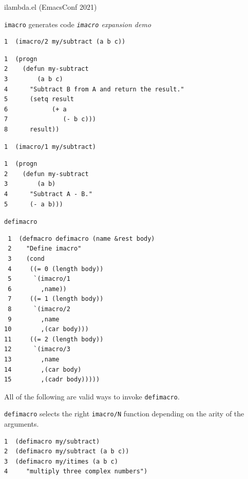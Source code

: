 \documentclass[presentation]{beamer}
\begin{document}
\begin{frame}[label={sec:org3d2ff35},fragile]{ilambda.el (EmacsConf 2021)}
\begin{block}{\texttt{imacro} generates code}
\emph{\texttt{imacro} expansion demo}

\begin{verbatim}
1  (imacro/2 my/subtract (a b c))
\end{verbatim}

\begin{verbatim}
1  (progn
2    (defun my-subtract
3        (a b c)
4      "Subtract B from A and return the result."
5      (setq result
6            (+ a
7               (- b c)))
8      result))
\end{verbatim}

\begin{verbatim}
1  (imacro/1 my/subtract)
\end{verbatim}

\begin{verbatim}
1  (progn
2    (defun my-subtract
3        (a b)
4      "Subtract A - B."
5      (- a b)))
\end{verbatim}

\texttt{defimacro}

\begin{verbatim}
 1  (defmacro defimacro (name &rest body)
 2    "Define imacro"
 3    (cond
 4     ((= 0 (length body))
 5      `(imacro/1
 6        ,name))
 7     ((= 1 (length body))
 8      `(imacro/2
 9        ,name
10        ,(car body)))
11     ((= 2 (length body))
12      `(imacro/3
13        ,name
14        ,(car body)
15        ,(cadr body)))))
\end{verbatim}

All of the following are valid ways to invoke \texttt{defimacro}.

\texttt{defimacro} selects the right \texttt{imacro/N} function depending on the arity of the arguments.

\begin{verbatim}
1  (defimacro my/subtract)
2  (defimacro my/subtract (a b c))
3  (defimacro my/itimes (a b c)
4     "multiply three complex numbers")
\end{verbatim}
\end{block}
\end{frame}
\end{document}
